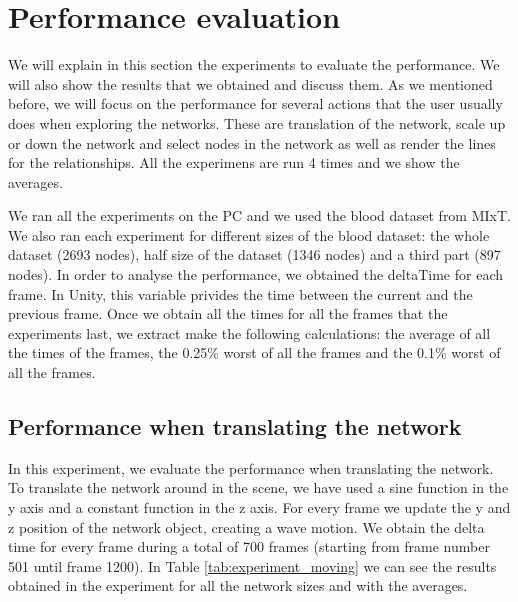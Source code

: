 \section{Performance evaluation}
We will explain in this section the experiments to evaluate the performance. We will also show the results that we obtained and discuss them. As we mentioned before, we will focus on the performance for several actions that the user usually does when exploring the networks. These are translation of the network, scale up or down the network and select nodes in the network as well as render the lines for the relationships. All the experimens are run 4 times and we show the averages.

We ran all the experiments on the PC and we used the blood dataset from MIxT. We also ran each experiment for different sizes of the blood dataset: the whole dataset (2693 nodes), half size of the dataset (1346 nodes) and a third part (897 nodes). In order to analyse the performance, we obtained the deltaTime for each frame. In Unity, this variable privides the time between the current and the previous frame. Once we obtain all the times for all the frames that the experiments last, we extract make the following calculations: the average of all the times of the frames, the 0.25\% worst of all the frames and the 0.1\% worst of all the frames.


\subsection{Performance when translating the network}
In this experiment, we evaluate the performance when translating the network. To translate the network around in the scene, we have used a sine function in the y axis and a constant function in the z axis. For every frame we update the y and z position of the network object, creating a wave motion. We obtain the delta time for every frame during a total of 700 frames (starting from frame number 501 until frame 1200). In Table \ref{tab:experiment_moving} we can see the results obtained in the experiment for all the network sizes and with the averages.

